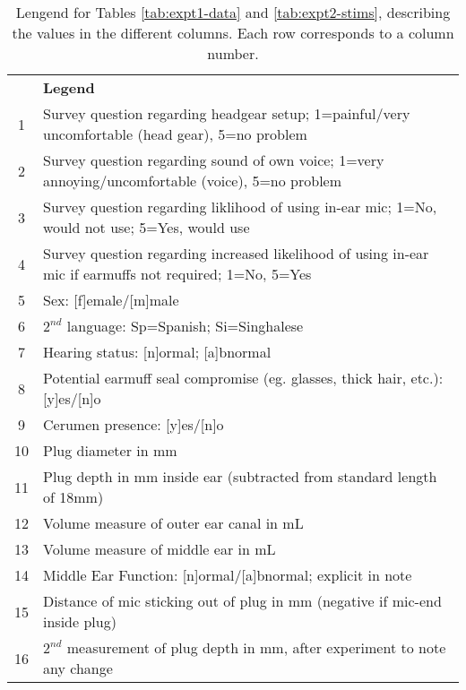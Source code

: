 \begin{table}
\begin{tabular}{c|p{13cm}}
  & \textbf{Legend} \\
1 & Survey question regarding headgear setup; 1=painful/very uncomfortable (head gear), 5=no problem \\
2 & Survey question regarding sound of own voice; 1=very annoying/uncomfortable (voice), 5=no problem \\
3 & Survey question regarding liklihood of using in-ear mic; 1=No, would not use; 5=Yes, would use \\
4 & Survey question regarding increased likelihood of using in-ear mic if earmuffs not required; 1=No, 5=Yes \\
5 & Sex: [f]emale/[m]male \\
6 & $2^{nd}$ language: Sp=Spanish; Si=Singhalese \\
7 & Hearing status: [n]ormal; [a]bnormal\\
8 & Potential earmuff seal compromise (eg. glasses, thick hair, etc.): [y]es/[n]o  \\
9 & Cerumen presence: [y]es/[n]o \\
10 & Plug diameter in mm \\
11 & Plug depth in mm inside ear (subtracted from standard length of 18mm)\\
12 & Volume measure of outer ear canal in mL \\
13 & Volume measure of middle ear in mL \\
14 & Middle Ear Function: [n]ormal/[a]bnormal; explicit in note \\
15 & Distance of mic sticking out of plug in mm (negative if mic-end inside plug) \\
16 & $2^{nd}$ measurement of plug depth in mm, after experiment to note any change \\
\end{tabular}
\caption{Lengend for Tables \ref{tab:expt1-data} and \ref{tab:expt2-stims}, describing the values in the different columns.  Each row corresponds to a column number.}\label{appAlegend}
\end{table}

